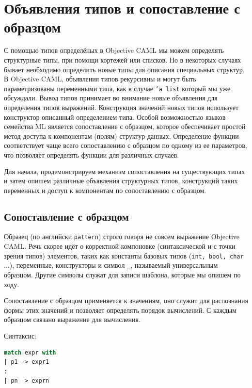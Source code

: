 \section{Объявления типов и сопоставление с образцом}
\label{sec:types_and_pattern_matching}

С помощью типов определёных в Objective CAML мы можем определять структурные
типы, при помощи кортежей или списков. Но в некоторых случаях бывает необходимо
определить новые типы для описания специальных структур. В Objective CAML,
объявления типов рекурсивны и могут быть параметризованы переменными типа, как в
случае \texttt{'a list} который мы уже обсуждали. Вывод типов принимает во
внимание новые объявления для определения типов выражений. Конструкция значений
новых типов использует конструктор описанный определением типа. Особой
возможностью языков семейства ML является сопоставление с образцом, которое
обеспечивает простой метод доступа к компонентам (полям) структур данных.
Определение функции соответствует чаще всего сопоставлению с образцом по одному
из ее параметров, что позволяет определять функции для различных случаев.

Для начала, продемонстрируем механизм сопоставления на существующих типах и
затем опишем различные объявления структурных типов, конструкций таких
переменных и доступ к компонентам по сопоставлению с образцом.

\subsection{Сопоставление с образцом}

 Образец (по английски \texttt{pattern}) строго говоря не совсем выражение
Objective CAML. Речь скорее идёт о корректной компоновке (синтаксической и с
точки зрения типов) элементов, таких как константы базовых типов (\texttt{int,
bool, char $\ldots$}), переменные, конструкторы и символ \texttt{\_}, называемый
универсальным образцом. Другие символы служат для записи шаблона, которые мы
опишем по ходу.

Сопоставление с образцом применяется к значениям, оно служит для распознания
формы этих значений и позволяет определять порядок вычислений. С каждым образцом
связано выражение для вычисления.

Синтаксис:

\begin{lstlisting}[language=OCaml]
match expr with
| p1 -> expr1
:
| pn -> exprn
\end{lstlisting}

